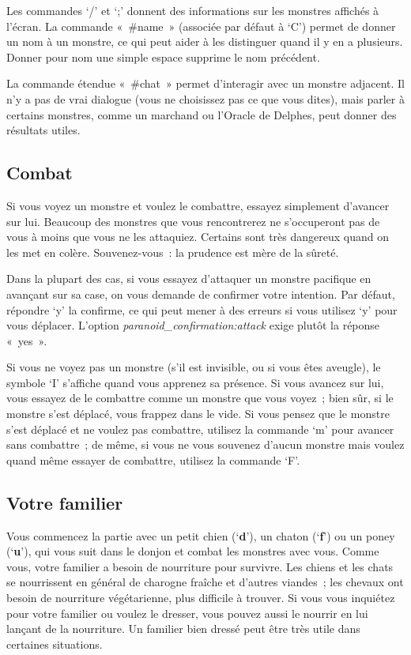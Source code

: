\documentclass[titlepage]{article}
\begin{document}
Les commandes `/' et `;' donnent des informations sur les
monstres affichés à l'écran.
La commande «~\#name~» (associée par défaut à `C') permet de
donner un nom à un monstre, ce qui peut aider à les distinguer quand il y
en a plusieurs.
Donner pour nom une simple espace supprime le nom précédent.


La commande étendue «~\#chat~» permet d'interagir avec un monstre
adjacent.
Il n'y a pas de vrai dialogue (vous ne choisissez pas ce que vous dites),
mais parler à certains monstres, comme un marchand ou l'Oracle de Delphes,
peut donner des résultats utiles.

\subsection{Combat}



Si vous voyez un monstre et voulez le combattre, essayez simplement
d'avancer sur lui.
Beaucoup des monstres que vous rencontrerez ne s'occuperont pas de vous à
moins que vous ne les attaquiez.
Certains sont très dangereux quand on les met en colère.
Souvenez-vous~: la prudence est mère de la sûreté.


Dans la plupart des cas, si vous essayez d'attaquer un monstre pacifique
en avançant sur sa case, on vous demande de confirmer votre intention.
Par défaut, répondre `y' la confirme, ce qui peut mener à des erreurs
si vous utilisez `y' pour vous déplacer.
L'option
\textit{paranoid\_confirmation:attack}
exige plutôt la réponse «~yes~».


Si vous ne voyez pas un monstre (s'il est invisible, ou si vous êtes
aveugle), le symbole `I' s'affiche quand vous apprenez sa présence.
Si vous avancez sur lui, vous essayez de le combattre comme un monstre que
vous voyez~; bien sûr, si le monstre s'est déplacé, vous frappez dans le
vide.
Si vous pensez que le monstre s'est déplacé et ne voulez pas combattre,
utilisez la commande `m' pour avancer sans combattre~; de même, si
vous ne vous souvenez d'aucun monstre mais voulez quand même essayer de
combattre, utilisez la commande `F'.

\subsection{Votre familier}



Vous commencez la partie avec un petit chien (`\textbf{d}'), un chaton
(`\textbf{f}') ou un poney (`\textbf{u}'), qui vous suit dans le
donjon et combat les monstres avec vous.
Comme vous, votre familier a besoin de nourriture pour survivre.
Les chiens et les chats se nourrissent en général de charogne fraîche et
d'autres viandes~; les chevaux ont besoin de nourriture végétarienne, plus
difficile à trouver.
Si vous vous inquiétez pour votre familier ou voulez le dresser, vous
pouvez aussi le nourrir en lui lançant de la nourriture.
Un familier bien dressé peut être très utile dans certaines situations.
\end{document}
